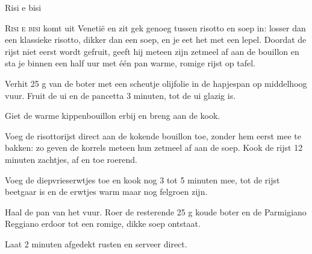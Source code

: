 \begin{recipe}{Risi e bisi}


\lettrine{R}{isi e bisi} komt uit Venetië en zit gek genoeg tussen risotto en
soep in: losser dan een klassieke risotto, dikker dan een soep, en je eet het
met een lepel. Doordat de rijst niet eerst wordt gefruit, geeft hij meteen
zijn zetmeel af aan de bouillon en sta je binnen een half uur met één pan
warme, romige rijst op tafel.

\begin{ingredients}
\end{ingredients}

\begin{steps}
  \item Verhit 25 g van de boter met een scheutje olijfolie in de hapjespan
        op middelhoog vuur. Fruit de ui en de pancetta 3 minuten, tot de ui
        glazig is.
  \item Giet de warme kippenbouillon erbij en breng aan de kook.
  \item Voeg de risottorijst direct aan de kokende bouillon toe, zonder hem
        eerst mee te bakken: zo geven de korrels meteen hun zetmeel af aan de
        soep. Kook de rijst 12 minuten zachtjes, af en toe roerend.
  \item Voeg de diepvrieserwtjes toe en kook nog 3 tot 5 minuten mee, tot de
        rijst beetgaar is en de erwtjes warm maar nog felgroen zijn.
  \item Haal de pan van het vuur. Roer de resterende 25 g koude boter en de
        Parmigiano Reggiano erdoor tot een romige, dikke soep ontstaat.
  \item Laat 2 minuten afgedekt rusten en serveer direct.
\end{steps}
\end{recipe}
